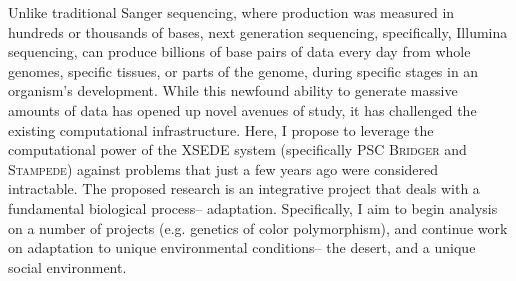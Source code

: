 \documentclass[10.5pt]{article}
\begin{document}
\noindent
Unlike traditional Sanger sequencing, where production was measured in hundreds or thousands of bases, next generation sequencing, specifically, Illumina sequencing, can produce billions of base pairs of data every day from whole genomes, specific tissues, or parts of the genome, during specific stages in an organism’s development.  While this newfound ability to generate massive amounts of data has opened up novel avenues of study, it has challenged the existing computational infrastructure. Here, I propose to leverage the computational power of the XSEDE system (specifically PSC \textsc{Bridger} and \textsc{Stampede}) against problems that just a few years ago were considered intractable.  The proposed research is an integrative project that deals with a fundamental biological process-- adaptation. Specifically, I aim to begin analysis on a number of projects (e.g. genetics of color polymorphism), and continue work on adaptation to unique environmental conditions-- the desert, and a unique social environment.  \\
\end{document}
